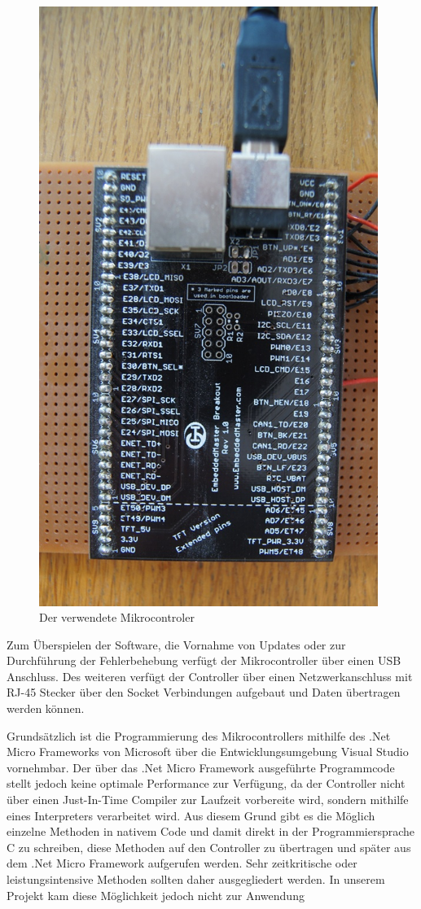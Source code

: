 \begin{figure}[H]
\centering
\includegraphics[width=11cm]{images/controler}
\caption{Der verwendete Mikrocontroler}
\end{figure}

Zum Überspielen der Software, die Vornahme von Updates oder zur Durchführung der Fehlerbehebung verfügt der Mikrocontroller über einen USB Anschluss. Des weiteren verfügt der Controller über einen Netzwerkanschluss mit RJ-45 Stecker über den Socket Verbindungen aufgebaut und Daten übertragen werden können.

Grundsätzlich ist die Programmierung des Mikrocontrollers mithilfe des .Net Micro Frameworks von Microsoft über die Entwicklungsumgebung Visual Studio vornehmbar. Der über das .Net Micro Framework ausgeführte Programmcode stellt jedoch keine optimale Performance zur Verfügung, da der Controller nicht über einen Just-In-Time Compiler zur Laufzeit vorbereite wird, sondern mithilfe eines Interpreters verarbeitet wird. Aus diesem Grund gibt es die Möglich einzelne Methoden in nativem Code und damit direkt in der Programmiersprache C zu schreiben, diese Methoden auf den Controller zu übertragen und später aus dem .Net Micro Framework aufgerufen werden. Sehr zeitkritische oder leistungsintensive Methoden sollten daher ausgegliedert werden. In unserem Projekt kam diese Möglichkeit jedoch nicht zur Anwendung

